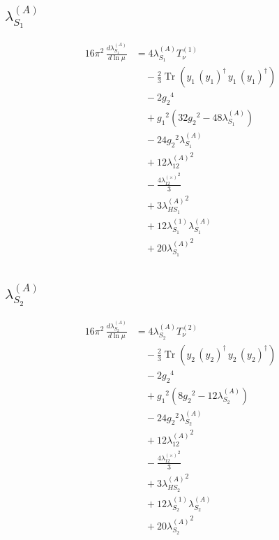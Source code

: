 \documentclass[10pt,a4paper]{article}
\begin{document}
\subsection*{$\lambda_{S_1}^{(A)}$}
\begin{align*}
16\pi^2\,\frac{d \lambda_{S_1}^{(A)}}{d\ln\mu} &=4 {\lambda_{S_1}^{(A)}} T_{\nu}^{(1)} \\
&\quad -\frac{2}{3} \operatorname{Tr}\!\left({y_1}\,\left({y_1}\right)^{\dagger}\,{y_1}\,\left({y_1}\right)^{\dagger}\right) \\
&\quad -2 {g_2}^4 \\
&\quad +{g_1}^2 \left(32 {g_2}^2-48 {\lambda_{S_1}^{(A)}}\right) \\
&\quad -24 {g_2}^2 {\lambda_{S_1}^{(A)}} \\
&\quad +12 {\lambda_{12}^{(A)}}^2 \\
&\quad -\frac{4 {\lambda_{12}^{(\times)}}^2}{3} \\
&\quad +3 {\lambda_{HS_1}^{(A)}}^2 \\
&\quad +12 {\lambda_{S_1}^{(1)}} {\lambda_{S_1}^{(A)}} \\
&\quad +20 {\lambda_{S_1}^{(A)}}^2 \\
\end{align*}
\subsection*{$\lambda_{S_2}^{(A)}$}
\begin{align*}
16\pi^2\,\frac{d \lambda_{S_2}^{(A)}}{d\ln\mu} &=4 {\lambda_{S_2}^{(A)}} T_{\nu}^{(2)} \\
&\quad -\frac{2}{3} \operatorname{Tr}\!\left({y_2}\,\left({y_2}\right)^{\dagger}\,{y_2}\,\left({y_2}\right)^{\dagger}\right) \\
&\quad -2 {g_2}^4 \\
&\quad +{g_1}^2 \left(8 {g_2}^2-12 {\lambda_{S_2}^{(A)}}\right) \\
&\quad -24 {g_2}^2 {\lambda_{S_2}^{(A)}} \\
&\quad +12 {\lambda_{12}^{(A)}}^2 \\
&\quad -\frac{4 {\lambda_{12}^{(\times)}}^2}{3} \\
&\quad +3 {\lambda_{HS_2}^{(A)}}^2 \\
&\quad +12 {\lambda_{S_2}^{(1)}} {\lambda_{S_2}^{(A)}} \\
&\quad +20 {\lambda_{S_2}^{(A)}}^2 \\
\end{align*}
\end{document}
